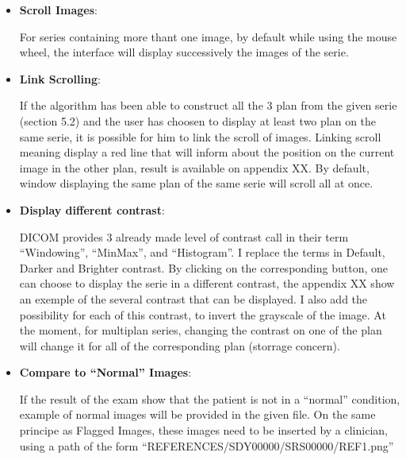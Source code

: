 \begin{itemize}
	\item {\IconScroll} \textbf{Scroll Images}:
	
	\newline \vspace{3mm}
	
	For series containing more thant one image, by default while using the mouse wheel, the interface will display successively the images of the serie.
	
	\item {\IconLink} \textbf{Link Scrolling}:
	
	\newline \vspace{3mm}
	
	If the algorithm has been able to construct all the 3 plan from the given serie (section 5.2) and the user has choosen to display at least two plan on the same serie, it is possible for him to link the scroll of images. Linking scroll meaning display a red line that will inform about the position on the current image in the other plan, result is available on appendix XX. By default, window displaying the same plan of the same serie will scroll all at once.
	
	\item {\IconContrast} \textbf{Display different contrast}:
	
	\newline \vspace{3mm}
	
	DICOM provides 3 already made level of contrast call in their term ``Windowing'', ``MinMax'', and ``Histogram''. I replace the terms in Default, Darker and Brighter contrast. By clicking on the corresponding button, one can choose to display the serie in a different contrast, the appendix XX show an exemple of the several contrast that can be displayed. I also add the possibility for each of this contrast, to invert the grayscale of the image. At the moment, for multiplan series, changing the contrast on one of the plan will change it for all of the corresponding plan (storrage concern). 
	
	\item {\IconContrast} \textbf{Compare to ``Normal'' Images}:
	
	\newline \vspace{3mm}
	
	If the result of the exam show that the patient is not in a ``normal'' condition, example of normal images will be provided in the given file. On the same principe as Flagged Images, these images need to be inserted by a clinician, using a path of the form ``REFERENCES/SDY00000/SRS00000/REF1.png''
	

\end{itemize}
